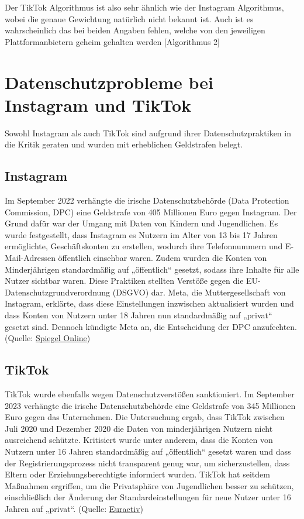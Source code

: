 \documentclass[12pt]{report}
\begin{document}
Der TikTok Algorithmus ist also sehr ähnlich wie der Instagram Algorithmus, wobei die genaue Gewichtung natürlich nicht bekannt ist. Auch ist es wahrscheinlich das bei beiden Angaben fehlen, welche von den jeweiligen Plattformanbietern geheim gehalten werden [Algorithmus 2]


\section{Datenschutzprobleme bei Instagram und TikTok}

Sowohl Instagram als auch TikTok sind aufgrund ihrer Datenschutzpraktiken in die Kritik geraten und wurden mit erheblichen Geldstrafen belegt.

\subsection{Instagram}
Im September 2022 verhängte die irische Datenschutzbehörde (Data Protection Commission, DPC) eine Geldstrafe von 405 Millionen Euro gegen Instagram. Der Grund dafür war der Umgang mit Daten von Kindern und Jugendlichen. Es wurde festgestellt, dass Instagram es Nutzern im Alter von 13 bis 17 Jahren ermöglichte, Geschäftskonten zu erstellen, wodurch ihre Telefonnummern und E-Mail-Adressen öffentlich einsehbar waren. Zudem wurden die Konten von Minderjährigen standardmäßig auf „öffentlich“ gesetzt, sodass ihre Inhalte für alle Nutzer sichtbar waren. Diese Praktiken stellten Verstöße gegen die EU-Datenschutzgrundverordnung (DSGVO) dar. Meta, die Muttergesellschaft von Instagram, erklärte, dass diese Einstellungen inzwischen aktualisiert wurden und dass Konten von Nutzern unter 18 Jahren nun standardmäßig auf „privat“ gesetzt sind. Dennoch kündigte Meta an, die Entscheidung der DPC anzufechten.  
(Quelle: \href{https://www.spiegel.de/netzwelt/netzpolitik/datenschutz-instagram-muss-in-irland-405-millionen-euro-strafe-zahlen-a-50fe2d10-c014-4a68-9cb8-b0b590d7cca5}{Spiegel Online})

\subsection{TikTok}
TikTok wurde ebenfalls wegen Datenschutzverstößen sanktioniert. Im September 2023 verhängte die irische Datenschutzbehörde eine Geldstrafe von 345 Millionen Euro gegen das Unternehmen. Die Untersuchung ergab, dass TikTok zwischen Juli 2020 und Dezember 2020 die Daten von minderjährigen Nutzern nicht ausreichend schützte. Kritisiert wurde unter anderem, dass die Konten von Nutzern unter 16 Jahren standardmäßig auf „öffentlich“ gesetzt waren und dass der Registrierungsprozess nicht transparent genug war, um sicherzustellen, dass Eltern oder Erziehungsberechtigte informiert wurden. TikTok hat seitdem Maßnahmen ergriffen, um die Privatsphäre von Jugendlichen besser zu schützen, einschließlich der Änderung der Standardeinstellungen für neue Nutzer unter 16 Jahren auf „privat“.  
(Quelle: \href{https://www.euractiv.de/section/innovation/news/irische-datenschutzbehoerde-verhaengt-405-millionen-euro-strafe-gegen-instagram/}{Euractiv})
\end{document}
